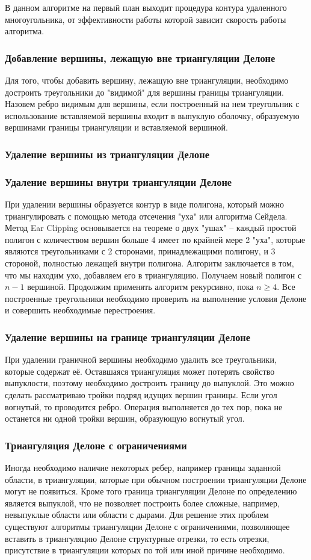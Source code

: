 \documentclass{fefu}
\begin{document}
В данном алгоритме на первый план выходит процедура контура удаленного многоугольника, от эффективности работы которой
зависит скорость работы алгоритма.
\subsubsection{Добавление вершины, лежащую вне триангуляции Делоне}
\label{AddOutsideOfTriangulationVertex}
Для того, чтобы добавить вершину, лежащую вне триангуляции, необходимо достроить треугольники до "видимой" для вершины
границы триангуляции. Назовем ребро видимым для вершины, если построенный на нем треугольник с использование вставляемой
вершины  входит в выпуклую оболочку, образуемую вершинами границы триангуляции и вставляемой вершиной.
\subsubsection{Удаление вершины из триангуляции Делоне}
\subsubsection{Удаление вершины внутри триангуляции Делоне}
При удалении вершины образуется контур в виде полигона, который можно триангулировать с помощью метода отсечения
"уха" \cite{EarClipping} или алгоритма Сейдела\cite{Seidel}. Метод Ear Clipping основывается на теореме о двух "ушах" --
каждый простой полигон с количеством вершин больше 4 имеет по крайней мере 2 "уха", которые являются треугольниками с 2
сторонами, принадлежащими полигону, и 3 стороной, полностью лежащей внутри полигона. Алгоритм заключается в том, что
мы находим ухо, добавляем его в триангуляцию. Получаем новый полигон с $n - 1$ вершиной. Продолжим применять алгоритм
рекурсивно, пока $n \geq 4$. Все построенные треугольники необходимо проверить на выполнение условия Делоне и совершить
необходимые перестроения.
\subsubsection{Удаление вершины на границе триангуляции Делоне}
При удалении граничной вершины необходимо удалить все треугольники, которые содержат её. Оставшаяся триангуляция может
потерять свойство выпуклости, поэтому необходимо достроить границу до выпуклой. Это можно сделать рассматриваю тройки
подряд идущих вершин границы. Если угол вогнутый, то проводится ребро. Операция выполняется до тех пор, пока не останется
ни одной тройки вершин, образующую вогнутый угол.
\subsubsection{Триангуляция Делоне с ограничениями}
Иногда необходимо наличие некоторых ребер, например границы заданной области, в триангуляции, которые при обычном построении триангуляции Делоне могут 
не появиться. Кроме того граница триангуляции Делоне по определению является выпуклой, что не позволяет построить более 
сложные, например, невыпуклые области или области с дырами. Для решение этих проблем существуют алгоритмы триангуляции 
Делоне с ограничениями, позволяющее вставить в триангуляцию Делоне структурные отрезки, то есть отрезки, присутствие в 
триангуляции которых по той или иной причине необходимо.
\end{document}
